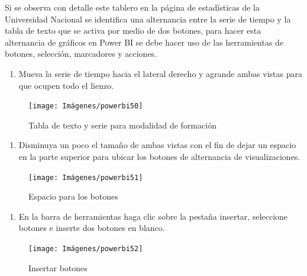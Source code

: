\documentclass[
]{book}
\providecommand{\tightlist}{%
  \setlength{\itemsep}{0pt}\setlength{\parskip}{0pt}}
\begin{document}
Si se observa con detalle este tablero en la página de estadísticas de la Universidad Nacional se identifica una alternancia entre la serie de tiempo y la tabla de texto que se activa por medio de dos botones, para hacer esta alternancia de gráficos en Power BI se debe hacer uso de las herramientas de botones, selección, marcadores y acciones.

\begin{enumerate}
\def\labelenumi{\arabic{enumi}.}
\tightlist
\item
  Mueva la serie de tiempo hacia el lateral derecho y agrande ambas vistas para que ocupen todo el lienzo.
\end{enumerate}

\begin{figure}

{\centering \texttt{[image: Imágenes/powerbi50]} 

}

\caption{Tabla de texto y serie para modalidad de formación}\label{fig:paso1alternancia-fig}
\end{figure}

\begin{enumerate}
\def\labelenumi{\arabic{enumi}.}
\setcounter{enumi}{1}
\tightlist
\item
  Disminuya un poco el tamaño de ambas vistas con el fin de dejar un espacio en la parte superior para ubicar los botones de alternancia de visualizaciones.
\end{enumerate}

\begin{figure}

{\centering \texttt{[image: Imágenes/powerbi51]} 

}

\caption{Espacio para los botones}\label{fig:paso2alternancia-fig}
\end{figure}

\begin{enumerate}
\def\labelenumi{\arabic{enumi}.}
\setcounter{enumi}{2}
\tightlist
\item
  En la barra de herramientas haga clic sobre la pestaña insertar, seleccione botones e inserte dos botones en blanco.
\end{enumerate}

\begin{figure}

{\centering \texttt{[image: Imágenes/powerbi52]} 

}

\caption{Insertar botones}\label{fig:paso3alternancia-fig}
\end{figure}
\end{document}
